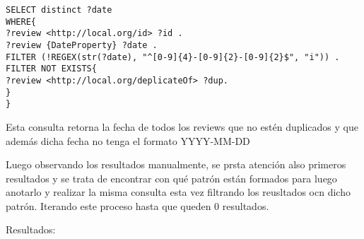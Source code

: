 \begin{lstlisting}[frame=single]  
SELECT distinct ?date 
WHERE{
?review <http://local.org/id> ?id .
?review {DateProperty} ?date .
FILTER (!REGEX(str(?date), "^[0-9]{4}-[0-9]{2}-[0-9]{2}$", "i")) .
FILTER NOT EXISTS{
?review <http://local.org/deplicateOf> ?dup.
}
}
\end{lstlisting}



Esta consulta retorna la fecha de todos los reviews que no estén duplicados y que además dicha fecha no tenga el formato YYYY-MM-DD

Luego observando los resultados manualmente, se prsta atención also primeros resultados y se trata de encontrar con qué patrón están formados 
para luego anotarlo y realizar la misma consulta esta vez filtrando los reusltados ocn dicho patrón. Iterando este proceso hasta que 
queden 0 resultados.

Resultados:

